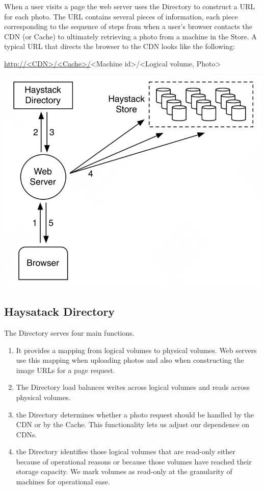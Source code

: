 \documentclass[11pt]{article}
\begin{document}
When a user visits a page the web server uses the Directory to construct a URL for each photo. The URL
contains several pieces of information, each piece corresponding to the sequence of steps from when a
user’s browser contacts the CDN (or Cache) to ultimately retrieving a photo from a machine in the
Store. A typical URL that directs the browser to the CDN looks like the following:
\begin{center}
\url{http://<CDN>/<Cache>/}<Machine id>/<Logical volume, Photo>
\end{center}

\begin{center}
\includegraphics[width=.8\textwidth]{../../images/papers/135.png}
\end{center}
\subsection{Haysatack Directory}
\label{sec:orga30c0bb}
The Directory serves four main functions.
\begin{enumerate}
\item It provides a mapping from logical volumes to physical volumes. Web servers use this mapping when
uploading photos and also when constructing the image URLs for a page request.
\item The Directory load balances writes across logical volumes and reads across physical volumes.
\item the Directory determines whether a photo request should be handled by the CDN or by the Cache. This
functionality lets us adjust our dependence on CDNs.
\item the Directory identifies those logical volumes that are read-only either because of operational
reasons or because those volumes have reached their storage capacity. We mark volumes as read-only
at the granularity of machines for operational ease.
\end{enumerate}
\end{document}

